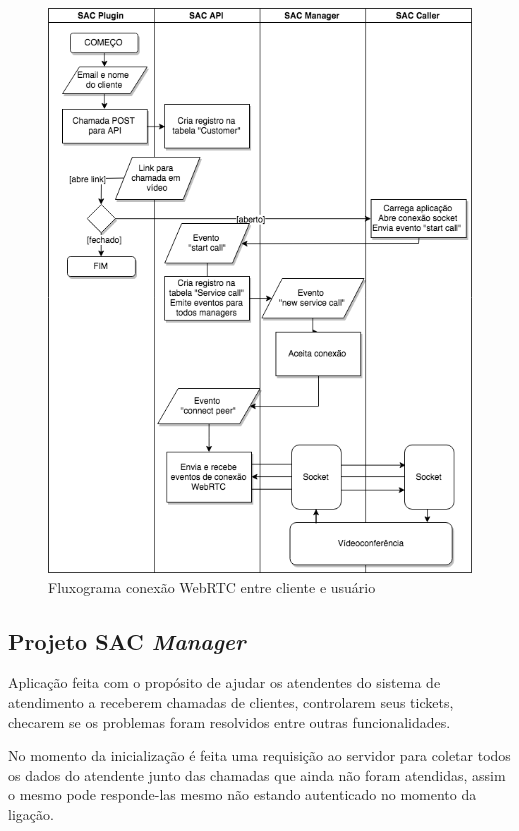 \begin{figure}[ht!]
	\centering
    \includegraphics[scale=0.6]{figures/webrtc-conn-flow.png}
	\caption{Fluxograma conexão WebRTC entre cliente e usuário}
	\label{fig:webrtc_conn_flow}
\end{figure}

\clearpage
\subsection{Projeto SAC \textit{Manager}}

Aplicação feita com o propósito de ajudar os atendentes do sistema de atendimento a receberem chamadas de clientes, controlarem seus tickets, checarem se os problemas foram resolvidos entre outras funcionalidades.

No momento da inicialização é feita uma requisição ao servidor para coletar todos os dados do atendente junto das chamadas que ainda não foram atendidas, assim o mesmo pode responde-las mesmo não estando autenticado no momento da ligação.

